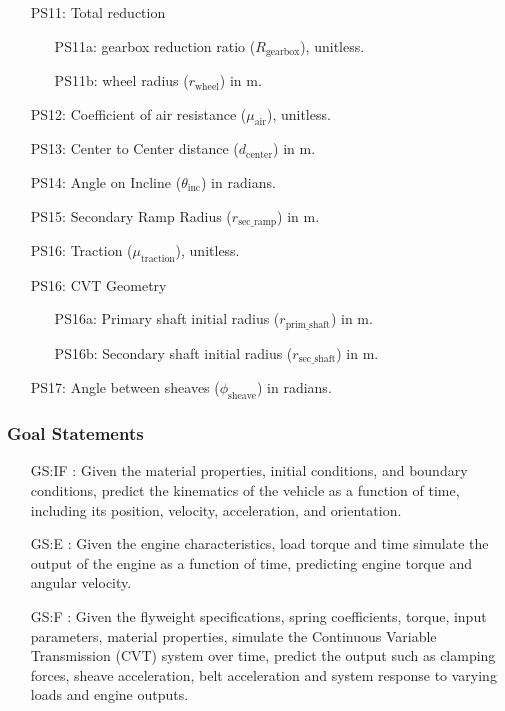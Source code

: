 \documentclass[12pt]{article}
\begin{document}
\begin{itemize}
\item[PS11:] Total reduction

\begin{itemize}
  \item [PS11a:] gearbox reduction ratio ($R_{\text{gearbox}}$), unitless.
  \item [PS11b:] wheel radius ($r_{\text{wheel}}$) in m.
\end{itemize}

\item[PS12:] Coefficient of air resistance ($\mu_{\text{air}}$), unitless.

\item[PS13:] Center to Center distance ($d_{\text{center}}$) in m.

\item[PS14:] Angle on Incline ($\theta_{\text{inc}}$) in radians.

\item[PS15:] Secondary Ramp Radius ($r_{\text{sec\_ramp}}$) in m.

\item[PS16:] Traction ($\mu_{\text{traction}}$), unitless.

\item[PS16:] CVT Geometry
\item[] \begin{itemize}
  \item [PS16a:] Primary shaft initial radius ($r_{\text{prim\_shaft}}$) in m.
  \item [PS16b:] Secondary shaft initial radius ($r_{\text{sec\_shaft}}$) in m.
\end{itemize}

\item[PS17:] Angle between sheaves ($\phi_{\text{sheave}}$) in radians. 

\end{itemize}

\subsubsection{Goal Statements}

\begin{itemize}

  \item[GS:IF \label{GS:IF}:]  Given the material properties, initial conditions, and boundary conditions, predict the kinematics of the vehicle as a function of time, including its position, velocity, acceleration, and orientation.
  \item[GS:E \label{GS:E}:]  Given the engine characteristics, load torque and time simulate the output of the engine as a function of time, predicting engine torque and angular velocity.
  \item[GS:F \label{GS:F}:]  Given the flyweight specifications, spring coefficients, torque, input parameters, material properties, simulate the Continuous Variable Transmission (CVT) system over time, predict the output such as clamping forces, sheave acceleration, belt acceleration and system response to varying loads and engine outputs.

\end{itemize}
\end{document}
